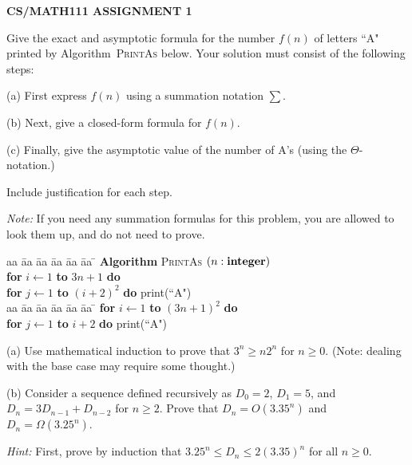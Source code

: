 \documentclass{article}
\begin{document}
\centerline{\large \bf CS/MATH111 ASSIGNMENT 1}

\vskip 0.1in


\vskip 0.2in


\begin{problem}
Give the exact and asymptotic formula for the number $f(n)$ of
letters ``A" printed by Algorithm~\textsc{PrintAs} below.
Your solution must consist of the following steps:
%
\begin{description}
\item{(a)} First express $f(n)$ using a summation notation $\sum$.
\item{(b)} Next, give a closed-form formula for $f(n)$.
\item{(c)}  Finally, give the asymptotic value of the
number of A's (using the $\Theta$-notation.)
\end{description}
\noindent
Include justification for each step. 

\smallskip
\noindent
\emph{Note:} If you need any summation formulas for this problem, you are allowed to look them up, and do not need to prove.

\begin{tabbing}
aa \= aa \= aa \= aa \= aa \= aa \= \kill
\textbf{Algorithm} \textsc{PrintAs} $(n: \mbox{\bf integer})$ \\
      \> \textbf{for} $i \leftarrow 1$ \textbf{to} $3n+1$
                         \textbf{do} \\
      \> \> \textbf{for} $j \leftarrow 1$ \textbf{to} $(i+2)^2$ \textbf{do} print(``A")\\
      
aa \= aa \= aa \= aa \= aa \= aa \= \kill
      \> \textbf{for} $i \leftarrow 1$ \textbf{to} $(3n+1)^2$
                         \textbf{do} \\
      \> \> \textbf{for} $j \leftarrow 1$ \textbf{to} $i+2$ \textbf{do} print(``A")
\end{tabbing}
\end{problem}


\begin{problem}
(a) Use mathematical induction to prove that $3^n \ge n2^n$ for $n\ge 0$. 
(Note: dealing with the base case may require some thought.)

\smallskip
\noindent (b) Consider a sequence defined recursively as
$D_0 = 2$, $D_1 = 5$, and $D_n = 3D_{n-1}+D_{n-2}$ for
$n\ge 2$. Prove that $D_n = O(3.35^n)$ and $D_n = \Omega(3.25^n)$.

\smallskip
\noindent
\emph{Hint:} 
First, prove by induction that $3.25^n \le D_n \le 2(3.35)^n$ for all $n\ge 0$.
\end{problem}
\end{document}
